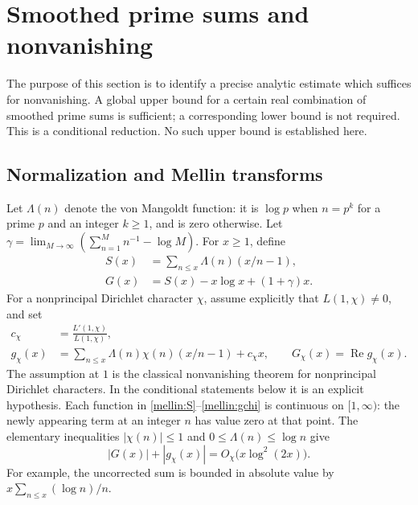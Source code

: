 \section{Smoothed prime sums and nonvanishing}
\label{sec:prime-sum-reduction}

The purpose of this section is to identify a precise analytic estimate
which suffices for nonvanishing.  A global upper bound for a certain real
combination of smoothed prime sums is sufficient; a corresponding lower
bound is not required.  This is a conditional reduction.  No such upper
bound is established here.

\subsection{Normalization and Mellin transforms}

Let $\Lambda(n)$ denote the von Mangoldt function: it is $\log p$ when
$n=p^k$ for a prime $p$ and an integer $k\geq1$, and is zero otherwise.
Let $\gamma=\lim_{M\to\infty}(\sum_{n=1}^M n^{-1}-\log M)$.
For $x\geq1$, define
\begin{align}
 S(x)&=\sum_{n\leq x}\Lambda(n)(x/n-1),\label{mellin:S}\\
 G(x)&=S(x)-x\log x+(1+\gamma)x.\label{mellin:G}
\end{align}
For a nonprincipal Dirichlet character $\chi$, assume explicitly that
$L(1,\chi)\neq0$, and set
\begin{align}
 c_\chi&=\frac{L'(1,\chi)}{L(1,\chi)},\label{mellin:cchi}\\
 g_\chi(x)&=\sum_{n\leq x}\Lambda(n)\chi(n)(x/n-1)+c_\chi x,
 \qquad G_\chi(x)=\operatorname{Re}g_\chi(x).\label{mellin:gchi}
\end{align}
The assumption at $1$ is the classical nonvanishing theorem for
nonprincipal Dirichlet characters.  In the conditional statements below
it is an explicit hypothesis.  Each function in
\eqref{mellin:S}--\eqref{mellin:gchi} is continuous on $[1,\infty)$:
the newly appearing term at an integer $n$ has value zero at that point.
The elementary inequalities $|\chi(n)|\leq1$ and
$0\leq\Lambda(n)\leq\log n$ give
\begin{equation}\label{mellin:trivial-growth}
 |G(x)|+|g_\chi(x)|=O_\chi\bigl(x\log^2(2x)\bigr).
\end{equation}
For example, the uncorrected sum is bounded in absolute value by
$x\sum_{n\leq x}(\log n)/n$.

